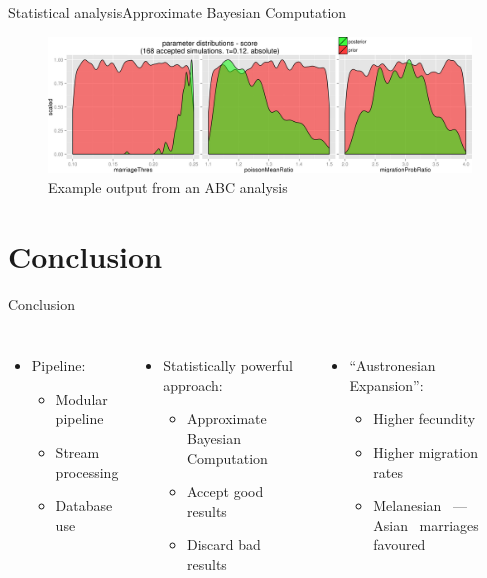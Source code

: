 \documentclass[10pt, aspectratio=43]{beamer}
\begin{document}
\begin{frame}{Statistical analysis}{Approximate Bayesian Computation}
\begin{center}
  \begin{figure}
    \hspace*{-0.85cm}
    \includegraphics[width=1.15\textwidth]{../data/abc-priors-posteriors.png}
    \caption{Example output from an ABC analysis}
  \end{figure}
\end{center}
\end{frame}

\section*{Conclusion}
\begin{frame}{}{Conclusion}
\begin{columns}
  \color{masseyWhite}
  \begin{itemize}
    \item Pipeline:
    \begin{itemize}
      \item Modular pipeline
      \item Stream processing
      \item Database use
    \end{itemize}
  \end{itemize}
  \vspace*{1em}
  \begin{itemize}
    \item Statistically powerful approach:
    \begin{itemize}
      \item Approximate Bayesian Computation
      \item Accept good results
      \item Discard bad results
    \end{itemize}
  \end{itemize}

  \color{masseyWhite}
  \begin{itemize}
    \item “Austronesian Expansion”:
    \begin{itemize}
      \item Higher fecundity
      \item Higher migration rates
      \item Melanesian~\mars{} --- Asian~\female{} marriages favoured
    \end{itemize}
  \end{itemize}

\end{columns}
\end{frame}
\end{document}
